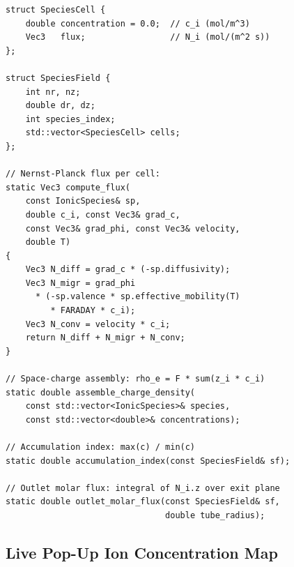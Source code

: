 \documentclass[11pt,a4paper]{article}
\begin{document}
\begin{lstlisting}[style=cpp,title={\textbf{SpeciesField and Nernst--Planck flux computation}}]
struct SpeciesCell {
    double concentration = 0.0;  // c_i (mol/m^3)
    Vec3   flux;                 // N_i (mol/(m^2 s))
};

struct SpeciesField {
    int nr, nz;
    double dr, dz;
    int species_index;
    std::vector<SpeciesCell> cells;
};

// Nernst-Planck flux per cell:
static Vec3 compute_flux(
    const IonicSpecies& sp,
    double c_i, const Vec3& grad_c,
    const Vec3& grad_phi, const Vec3& velocity,
    double T)
{
    Vec3 N_diff = grad_c * (-sp.diffusivity);
    Vec3 N_migr = grad_phi
      * (-sp.valence * sp.effective_mobility(T)
         * FARADAY * c_i);
    Vec3 N_conv = velocity * c_i;
    return N_diff + N_migr + N_conv;
}

// Space-charge assembly: rho_e = F * sum(z_i * c_i)
static double assemble_charge_density(
    const std::vector<IonicSpecies>& species,
    const std::vector<double>& concentrations);

// Accumulation index: max(c) / min(c)
static double accumulation_index(const SpeciesField& sf);

// Outlet molar flux: integral of N_i.z over exit plane
static double outlet_molar_flux(const SpeciesField& sf,
                                double tube_radius);
\end{lstlisting}

\subsection{Live Pop-Up Ion Concentration Map}
\end{document}
